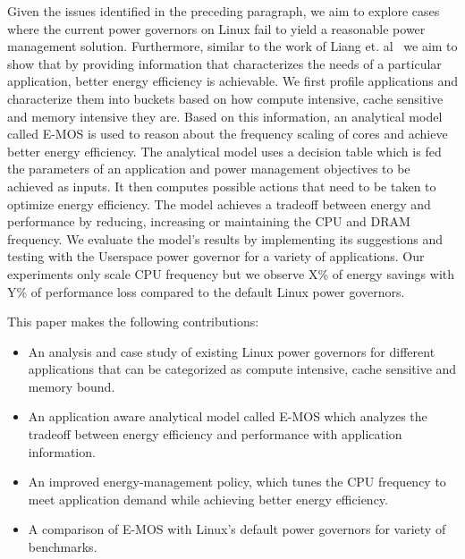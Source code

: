 Given the issues identified in the preceding paragraph, we aim to explore cases where the current power governors on Linux fail to yield a reasonable power management solution. 
Furthermore, similar to the work of Liang et. al~\cite{and-dvfs} we aim to show that by providing information that characterizes the needs of a particular application, 
better energy efficiency is achievable. We first profile applications and characterize them into buckets based on how compute intensive, cache sensitive and memory intensive they are. 
Based on this information, an analytical model called E-MOS is used to reason about the frequency scaling of cores and achieve better energy efficiency. 
The analytical model uses a decision table which is fed the parameters of an application and power management objectives to be achieved as inputs.
It then computes possible actions that need to be taken to optimize energy efficiency.
The model achieves a tradeoff between energy and performance by reducing, increasing or maintaining the CPU and DRAM frequency. 
We evaluate the model's results by implementing its suggestions and testing with the Userspace power governor for a variety of applications. Our experiments only scale CPU frequency but we 
observe X\% of energy savings with Y\% of performance loss compared to the default Linux power governors.

This paper makes the following contributions:
\begin{itemize}
\item  An analysis and case study of existing Linux power governors for different applications that can be categorized as compute intensive, cache sensitive and memory bound. 
\item  An application aware analytical model called E-MOS which analyzes the tradeoff between energy efficiency and performance with application information.
\item  An improved energy-management policy, which tunes the CPU frequency to meet application demand while achieving better energy efficiency.
\item  A comparison of E-MOS with Linux's default power governors for variety of benchmarks.
\end{itemize}

